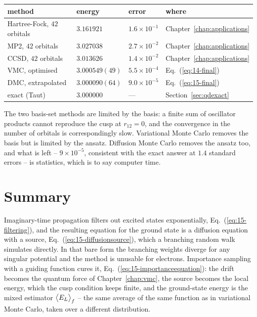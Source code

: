 \begin{center}
\renewcommand{\arraystretch}{1.2}
\setlength{\tabcolsep}{10pt}
\begin{tabular}{llll}
\toprule
method & energy & error & where\\
\midrule
Hartree-Fock, $42$ orbitals & $3.161921$ & $1.6\times10^{-1}$
  & Chapter~\ref{chap:applications}\\
MP2, $42$ orbitals & $3.027038$ & $2.7\times10^{-2}$
  & Chapter~\ref{chap:applications}\\
CCSD, $42$ orbitals & $3.013626$ & $1.4\times10^{-2}$
  & Chapter~\ref{chap:applications}\\
VMC, optimised & $3.000549(49)$ & $5.5\times10^{-4}$
  & Eq.~(\ref{eq:14-final})\\
DMC, extrapolated & $3.000090(64)$ & $9.0\times10^{-5}$
  & Eq.~(\ref{eq:15-final})\\
\midrule
exact (Taut) & $3.000000$ & --- & Section~\ref{sec:qdexact}\\
\bottomrule
\end{tabular}
\end{center}

\noindent
The two basis-set methods are limited by the basis: a finite sum of oscillator
products cannot reproduce the cusp at $r_{12}=0$, and the convergence in the
number of orbitals is correspondingly slow.  Variational Monte Carlo removes
the basis but is limited by the ansatz.  Diffusion Monte Carlo removes the
ansatz too, and what is left -- $9\times10^{-5}$, consistent with the exact
answer at $1.4$ standard errors -- is statistics, which is to say computer
time.

\section{Summary}
\label{sec:dmcsummary}

Imaginary-time propagation filters out excited states exponentially,
Eq.~(\ref{eq:15-filtering}), and the resulting equation for the ground state
is a diffusion equation with a source, Eq.~(\ref{eq:15-diffusionsource}),
which a branching random walk simulates directly.  In that bare form the
branching weights diverge for any singular potential and the method is
unusable for electrons.  Importance sampling with a guiding function cures it,
Eq.~(\ref{eq:15-importanceequation}): the drift becomes the quantum force of
Chapter~\ref{chap:vmc}, the source becomes the local energy, which the cusp
condition keeps finite, and the ground-state energy is the mixed estimator
$\big\langle E_L \big\rangle_f$ -- the same average of the same function as in variational
Monte Carlo, taken over a different distribution.

